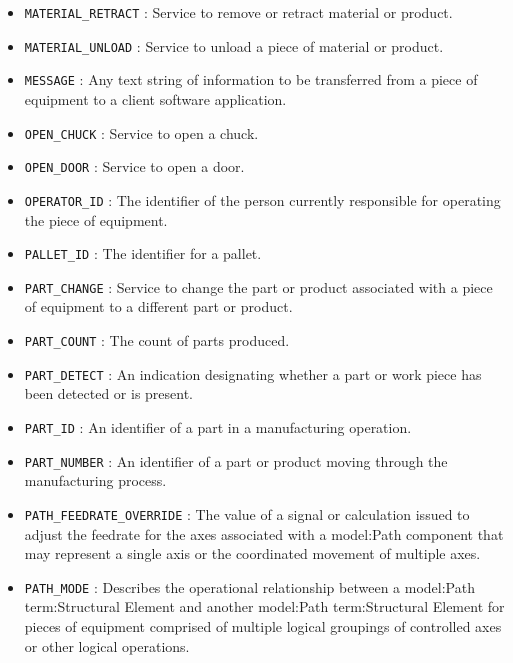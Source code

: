\begin{itemize}
\item \texttt{MATERIAL_RETRACT} : Service to remove or retract material or product. 

\item \texttt{MATERIAL_UNLOAD} : Service to unload a piece of material or product. 

\item \texttt{MESSAGE} : Any text string of information to be transferred from a piece of equipment to a client software application. 

\item \texttt{OPEN_CHUCK} : Service to open a chuck. 

\item \texttt{OPEN_DOOR} : Service to open a door. 

\item \texttt{OPERATOR_ID} : The identifier of the person currently responsible for operating the piece of equipment. 

\item \texttt{PALLET_ID} : The identifier for a pallet. 

\item \texttt{PART_CHANGE} : Service to change the part or product associated with a piece of equipment to a different part or product. 

\item \texttt{PART_COUNT} : The count of parts produced. 

\item \texttt{PART_DETECT} : An indication designating whether a part or work piece has been detected or is present. 

\item \texttt{PART_ID} : An identifier of a part in a manufacturing operation. 

\item \texttt{PART_NUMBER} : An identifier of a part or product moving through the manufacturing process. 

\item \texttt{PATH_FEEDRATE_OVERRIDE} : The value of a signal or calculation issued to adjust the feedrate for the axes associated with a {model:Path} component that may represent a single axis or the coordinated movement of multiple axes. 

\item \texttt{PATH_MODE} : Describes the operational relationship between a {model:Path} {term:Structural Element} and another {model:Path} {term:Structural Element} for pieces of equipment comprised of multiple logical groupings of controlled axes or other logical operations. 


\end{itemize}
